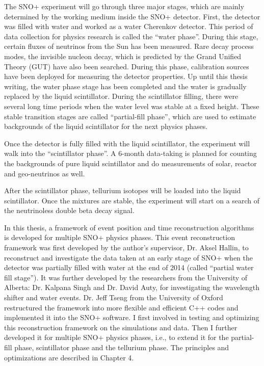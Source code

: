 The SNO+ experiment will go through three major stages, which are mainly determined by the working medium inside the SNO+ detector. First, the detector was filled with water and worked as a water Cherenkov detector. This period of data collection for physics research is called the ``water phase''. During this stage, certain fluxes of neutrinos from the Sun has been measured. Rare decay process modes, the invisible nucleon decay, which is predicted by the Grand Unified Theory (GUT) have also been searched. During this phase, calibration sources have been deployed for measuring the detector properties. Up until this thesis writing, the water phase stage has been completed and the water is gradually replaced by the liquid scintillator. During the scintillator filling, there were several long time periods when the water level was stable at a fixed height. These stable transition stages are called ``partial-fill phase'', which are used to estimate backgrounds of the liquid scintillator for the next physics phases.

Once the detector is fully filled with the liquid scintillator, the experiment will walk into the ``scintillator phase''. A 6-month data-taking is planned for counting the backgrounds of pure liquid scintillator and do measurements of solar, reactor and geo-neutrinos as well.%

After the scintillator phase, tellurium isotopes will be loaded into the liquid scintillator. Once the mixtures are stable, the experiment will start on a search of the neutrinoless double beta decay signal.

In this thesis, a framework of event position and time reconstruction algorithms is developed for multiple SNO+ physics phases. This event reconstruction framework was first developed by the author's supervisor, Dr. Aksel Hallin, to reconstruct and investigate the data taken at an early stage of SNO+ when the detector was partially filled with water at the end of 2014 (called ``partial water fill stage'')\cite{partialWater}. It was further developed by the researchers from the University of Alberta: Dr. Kalpana Singh and Dr. David Auty, for investigating the wavelength shifter and water events\cite{davidPartialWater, kalpanaWLS, kalpanaWLS2, kalpanaMPFitter}. Dr. Jeff Tseng from the University of Oxford restructured the framework into more flexible and efficient C++ codes and implemented it into the SNO+ software\cite{jieMPW}. I first involved in testing and optimizing this reconstruction framework on the simulations and data. Then I further developed it for multiple SNO+ physics phases, i.e., to extend it for the partial-fill phase, scintillator phase and the tellurium phase. The principles and optimizations are described in Chapter 4.

